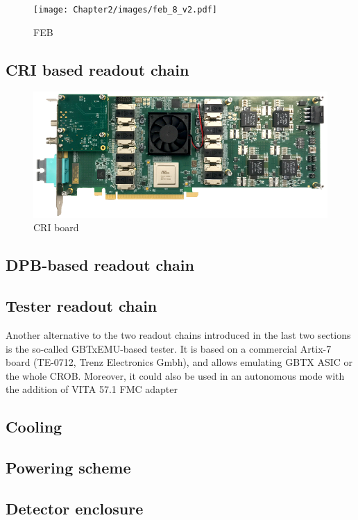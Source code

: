 \begin{figure}[!h]
\centering
\texttt{[image: Chapter2/images/feb\_8\_v2.pdf]}
\caption{FEB}
\label{fig_febA_photo}
\end{figure}
\subsection{CRI based readout chain}
\begin{figure}[!h]
\centering
\includegraphics[width=0.65\columnwidth]{Chapter2/images/cri_board_atlas.pdf}
\caption{CRI board}
\label{fig_cri_board}
\end{figure}
\subsection{DPB-based readout chain}

\subsection{Tester readout chain}
\label{tester}
Another alternative to the two readout chains introduced in the last two sections is the so-called GBTxEMU-based tester. It is based on a commercial Artix-7 board (TE-0712, Trenz Electronics Gmbh), and allows emulating GBTX ASIC or the whole CROB. Moreover, it could also be used in an autonomous mode with the addition of VITA  57.1 FMC adapter

\subsection{Cooling}
\label{cooling}
\subsection{Powering scheme}
\label{powering}
\subsection{Detector enclosure}
